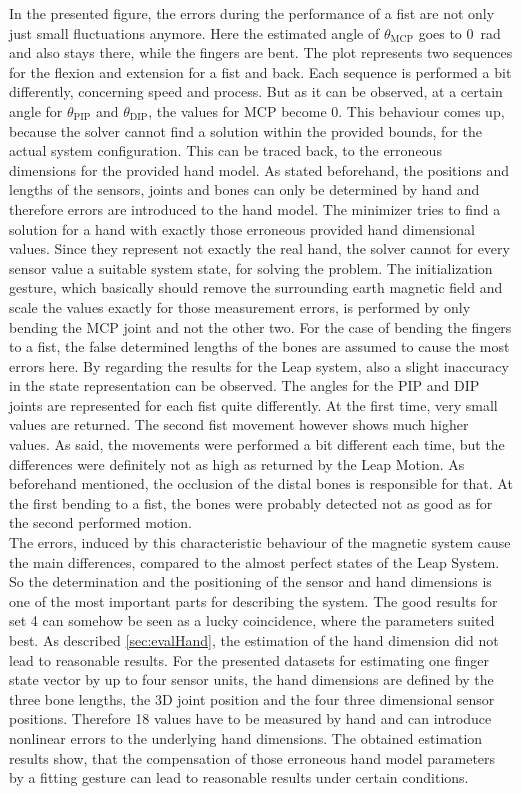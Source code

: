 In the presented figure, the errors during the performance of a fist are not only just small fluctuations anymore. Here the estimated angle of $ \theta_{\mathrm{MCP}} $ goes to \SI{0}{\radian} and also stays there, while the fingers are bent. The plot represents two sequences for the flexion and extension for a fist and back. Each sequence is performed a bit differently, concerning speed and process. But as it can be observed, at a certain angle for $ \theta_{\mathrm{PIP}} $ and $ \theta_{\mathrm{DIP}} $, the values for \ac{MCP} become 0. This behaviour comes up, because the solver cannot find a solution within the provided bounds, for the actual system configuration. This can be traced back, to the erroneous dimensions for the provided hand model. As stated beforehand, the positions and lengths of the sensors, joints and bones can only be determined by hand and therefore errors are introduced to the hand model. The minimizer tries to find a solution for a hand with exactly those erroneous provided hand dimensional values. Since they represent not exactly the real hand, the solver cannot for every sensor value a suitable system state, for solving the problem. The initialization gesture, which basically should remove the surrounding earth magnetic field and scale the values exactly for those measurement errors, is performed by only bending the \ac{MCP} joint and not the other two. For the case of bending the fingers to a fist, the false determined lengths of the bones are assumed to cause the most errors here. By regarding the results for the Leap system, also a slight inaccuracy in the state representation can be observed. The angles for the \ac{PIP} and \ac{DIP} joints are represented for each fist quite differently. At the first time, very small values are returned. The second fist movement however shows much higher values. As said, the movements were performed a bit different each time, but the differences were definitely not as high as returned by the Leap Motion. As beforehand mentioned, the occlusion of the distal bones is responsible for that. At the first bending to a fist, the bones were probably detected not as good as for the second performed motion. \\
The errors, induced by this characteristic behaviour of the magnetic system cause the main differences, compared to the almost perfect states of the Leap System. So the determination and the positioning of the sensor and hand dimensions is one of the most important parts for describing the system. The good results for set 4 can somehow be seen as a lucky coincidence, where the parameters suited best. As described \ref{sec:evalHand}, the estimation of the hand dimension did not lead to reasonable results. For the presented datasets for estimating one finger state vector by up to four sensor units, the hand dimensions are defined by the three bone lengths, the 3D joint position and the four three dimensional sensor positions. Therefore 18 values have to be measured by hand and can introduce nonlinear errors to the underlying hand dimensions. The obtained estimation results show, that the compensation of those erroneous hand model parameters by a fitting gesture can lead to reasonable results under certain conditions.

